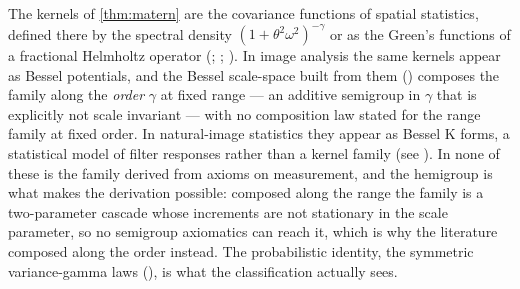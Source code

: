 \begin{remark}\label{rem:matern-literature}
The kernels of \ref{thm:matern} are the \Matern{} covariance functions of spatial statistics,
defined there by the spectral density $(1+\theta^2\omega^2)^{-\gamma}$ or as the Green's
functions of a fractional Helmholtz operator (;
; ). In image analysis the same kernels appear as
Bessel potentials, and the Bessel scale-space built from them ()
composes the family along the
\emph{order} $\gamma$ at fixed range --- an additive semigroup in $\gamma$ that is explicitly
not scale invariant --- with no composition law stated for the range family at fixed order. In
natural-image statistics they appear as Bessel K forms, a statistical model of filter responses
rather than a kernel family (see ). In none of these is the family derived from axioms on measurement,
and the hemigroup is what makes the derivation possible: composed along the range the family is
a two-parameter cascade whose increments are not stationary in the scale parameter, so no
semigroup axiomatics can
reach it, which is why the literature composed along the order instead. The probabilistic
identity, the symmetric variance-gamma laws (), is what the
classification actually sees.
\end{remark}
